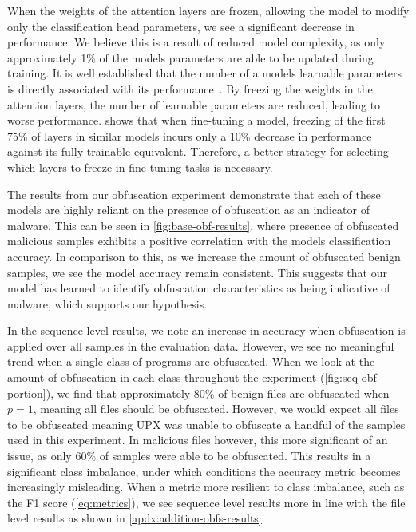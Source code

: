 \documentclass[conference,compsoc]{IEEEtran}
\begin{document}
When the weights of the attention layers are frozen, allowing the model to modify only the classification head parameters, we see a significant decrease in performance. We believe this is a result of reduced model complexity, as only approximately 1\% of the models parameters are able to be updated during training. It is well established that the number of a models learnable parameters is directly associated with its performance~\cite{kaplanScalingLawsNeural2020}. By freezing the weights in the attention layers, the number of learnable parameters are reduced, leading to worse performance. \cite{leeWhatWouldElsa2019} shows that when fine-tuning a model, freezing of the first 75\% of layers in similar models incurs only a 10\% decrease in performance against its fully-trainable equivalent. Therefore, a better strategy for selecting which layers to freeze in fine-tuning tasks is necessary. 

The results from our obfuscation experiment demonstrate that each of these models are highly reliant on the presence of obfuscation as an indicator of malware. This can be seen in \ref{fig:base-obf-results}, where presence of obfuscated malicious samples exhibits a positive correlation with the models classification accuracy. In comparison to this, as we increase the amount of obfuscated benign samples, we see the model accuracy remain consistent. This suggests that our model has learned to identify obfuscation characteristics as being indicative of malware, which supports our hypothesis. 

In the sequence level results, we note an increase in accuracy when obfuscation is applied over all samples in the evaluation data. However, we see no meaningful trend when a single class of programs are obfuscated. When we look at the amount of obfuscation in each class throughout the experiment (\ref{fig:seq-obf-portion}), we find that approximately 80\% of benign files are obfuscated when \(p = 1\), meaning all files should be obfuscated. However, we would expect all files to be obfuscated meaning UPX was unable to obfuscate a handful of the samples used in this experiment. In malicious files however, this more significant of an issue, as only 60\% of samples were able to be obfuscated. This results in a significant class imbalance, under which conditions the accuracy metric becomes increasingly misleading. When a metric more resilient to class imbalance, such as the F1 score (\ref{eq:metrics}), we see sequence level results more in line with the file level results as shown in \ref{apdx:addition-obfs-results}.
\end{document}
